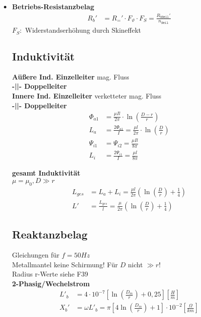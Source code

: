 \begin{itemize}
\item[]{\textbf{Betriebs-Resistanzbelag}}
\begin{align*}
    R_{b}' &= R_{=}' \cdot F_{\vartheta} \cdot F_{S} = \frac{R_{b\mathtt{Seil}}'}{n_{\mathtt{Seil}}}
\end{align*}
$F_S:$ Widerstandserhöhung durch Skineffekt
\newpage

\subsection{Induktivität}
\textbf{Aüßere Ind. Einzelleiter} \textcolor{dgreen}{mag. Fluss}\\
\textbf{-||- Doppelleiter}\\
\textbf{Innere Ind. Einzelleiter} \textcolor{dgreen}{verketteter mag. Fluss}\\
\textbf{-||- Doppelleiter}
\begin{align*}
    \Phi_{a1} &= \frac{\mu I l}{2 \pi} \cdot \ln \left( \frac{D-r}{r}\right)\\
    L_{a} &= \frac{2\Phi_{a1}}{I} = \frac{\mu l}{2 \pi} \cdot \ln \left( \frac{D}{r}\right)\\
    \Psi_{i1} &= \Psi_{i2} = \frac{\mu I l}{8 \pi}\\
    L_{i} &= \frac{2\Psi_{i1}}{I} = \frac{\mu l}{8 \pi}
\end{align*}

\textbf{gesamt Induktivität}\\
\textcolor{dgreen}{$\mu = \mu_{0}, D \gg r$}
\begin{align*}
    L_{ges} &= L_{a} + L_{i} = \frac{\mu l}{2\pi} \left( \ln \left(\frac{D}{r}\right) + \frac{1}{4}\right)\\
    L' &= \frac{L_{ges}}{l} = \frac{\mu }{2\pi} \left( \ln \left(\frac{D}{r}\right) + \frac{1}{4}\right)
\end{align*}

\subsection{Reaktanzbelag}
Gleichungen für $f=50 \mathit{Hz}$\\
Metallmantel keine Schirmung! Für $D$ nicht $\gg r$!\\
Radius r-Werte siehe F39\\

\textbf{2-Phasig/Wechelstrom}
\begin{align*}
    L'_b &= 4\cdot 10^{-7} \left[ \ln \left( \frac{D_m}{r} \right) + 0,25 \right] \left[\frac{H}{m} \right] \\
    X_{b}' &= \omega L'_b = \pi \left[ 4 \ln \left( \frac{D_m}{r}\right) +1 \right] \cdot 10 ^{-2}   \left[\frac{\Omega}{km}\right]
\end{align*}


\end{itemize}
